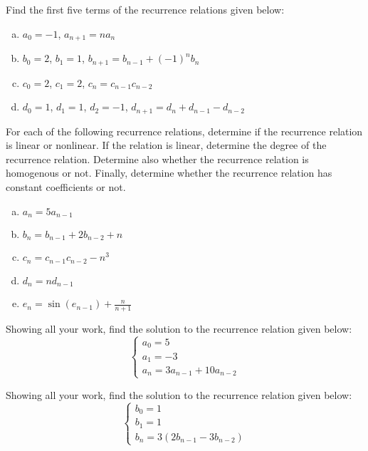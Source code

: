 \documentclass[11pt,letterpaper]{article}
\begin{document}

 Find the first five terms of the recurrence relations given below:
	\begin{enumerate}[(a)]
	\item $a_0= -1$, $a_{n + 1}= n a_n$
	\item $b_0= 2$, $b_1= 1$, $b_{n + 1}= b_{n - 1} + (-1)^n b_n$
	\item $c_0= 2$, $c_1= 2$, $c_n= c_{n - 1} c_{n - 2}$
	\item $d_0= 1$, $d_1= 1$, $d_2= -1$, $d_{n + 1}= d_n + d_{n - 1} - d_{n - 2}$
	\end{enumerate}



\newpage



 For each of the following recurrence relations, determine if the recurrence relation is linear or nonlinear. If the relation is linear, determine the degree of the recurrence relation. Determine also whether the recurrence relation is homogenous or not. Finally, determine whether the recurrence relation has constant coefficients or not. 
	\begin{enumerate}[(a)]
	\item $a_n= 5a_{n - 1}$
	\item $b_n= b_{n - 1} + 2b_{n - 2} + n$
	\item $c_n= c_{n - 1} c_{n - 2} - n^3$
	\item $d_n= n d_{n - 1}$
	\item $e_n= \sin(e_{n - 1}) + \frac{n}{n + 1}$
	\end{enumerate}



\newpage



 Showing all your work, find the solution to the recurrence relation given below:
	\[
	\begin{cases}
	a_0= 5 \\
	a_1= -3 \\
	a_n= 3a_{n - 1} + 10 a_{n - 2}
	\end{cases}
	\]



\newpage



 Showing all your work, find the solution to the recurrence relation given below:
	\[
	\begin{cases}
	b_0= 1 \\
	b_1= 1 \\
	b_n= 3(2b_{n - 1} - 3b_{n - 2})	
	\end{cases}
	\]
\end{document}
